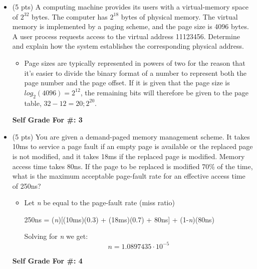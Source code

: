 \documentclass[conference]{IEEEtran}
\begin{document}
\begin{itemize}
	\item (5 pts) A computing machine provides its users with a virtual-memory space of $2^{32}$ bytes.
	The computer has $2^{18}$ bytes of physical memory. The virtual memory is implemented by a
	paging scheme, and the page size is 4096 bytes. A user process requests access to the virtual
	address 11123456. Determine and explain how the system establishes the corresponding physical
	address.
	\begin{itemize} 
		\item Page sizes are typically represented in powers of two for the reason that it's easier to divide the binary format of a number to represent both the page number and the page offset. If it is given that the page size is $log_{2}(4096) = 2^{12}$, the remaining bits will therefore be given to the page table, $32 - 12 = 20; 2^{20}$. 
	\end{itemize}

\begin{center}
\textbf{Self Grade For \#: 3}
\end{center}
\end{itemize}


\begin{itemize}
	\item (5 pts) You are given a demand-paged memory management scheme. It takes 10ms to service
	a page fault if an empty page is available or the replaced page is not modified, and it takes 18ms
	if the replaced page is modified. Memory access time takes 80ns. If the page to be replaced is
	modified 70\% of the time, what is the maximum acceptable page-fault rate for an effective
	access time of 250ns?
	\begin{itemize} 
		\item Let \textit{n} be equal to the page-fault rate (miss ratio)
		\begin{center}
		250ns = (\textit{n})[(10ms)(0.3) + (18ms)(0.7) + 80ns] + (1-\textit{n})(80ns) \\
		\end{center}
		Solving for \textit{n} we get: \\
		\begin{equation}
		n = 1.0897435\cdot10^{-5}
		\end{equation}
	\end{itemize}
	
	\begin{center}
		\textbf{Self Grade For \#: 4}
	\end{center}
\end{itemize}
\end{document}
